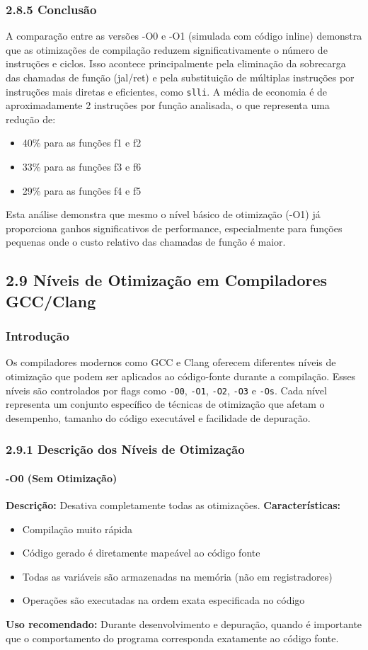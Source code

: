 \documentclass[12pt,a4paper]{article}
\begin{document}
\subsubsection*{2.8.5 Conclusão}
A comparação entre as versões -O0 e -O1 (simulada com código inline) demonstra que as otimizações de compilação reduzem significativamente o número de instruções e ciclos. Isso acontece principalmente pela eliminação da sobrecarga das chamadas de função (jal/ret) e pela substituição de múltiplas instruções por instruções mais diretas e eficientes, como \texttt{slli}.
A média de economia é de aproximadamente 2 instruções por função analisada, o que representa uma redução de:
\begin{itemize}
    \item 40\% para as funções f1 e f2
    \item 33\% para as funções f3 e f6
    \item 29\% para as funções f4 e f5
\end{itemize}
Esta análise demonstra que mesmo o nível básico de otimização (-O1) já proporciona ganhos significativos de performance, especialmente para funções pequenas onde o custo relativo das chamadas de função é maior.

\subsection*{2.9 Níveis de Otimização em Compiladores GCC/Clang}
\subsubsection*{Introdução}
Os compiladores modernos como GCC e Clang oferecem diferentes níveis de otimização que podem ser aplicados ao código-fonte durante a compilação. Esses níveis são controlados por flags como \texttt{-O0}, \texttt{-O1}, \texttt{-O2}, \texttt{-O3} e \texttt{-Os}. Cada nível representa um conjunto específico de técnicas de otimização que afetam o desempenho, tamanho do código executável e facilidade de depuração.

\subsubsection*{2.9.1 Descrição dos Níveis de Otimização}

\paragraph{-O0 (Sem Otimização)}
\textbf{Descrição:} Desativa completamente todas as otimizações.
\textbf{Características:}
\begin{itemize}
    \item Compilação muito rápida
    \item Código gerado é diretamente mapeável ao código fonte
    \item Todas as variáveis são armazenadas na memória (não em registradores)
    \item Operações são executadas na ordem exata especificada no código
\end{itemize}
\textbf{Uso recomendado:} Durante desenvolvimento e depuração, quando é importante que o comportamento do programa corresponda exatamente ao código fonte.
\end{document}
